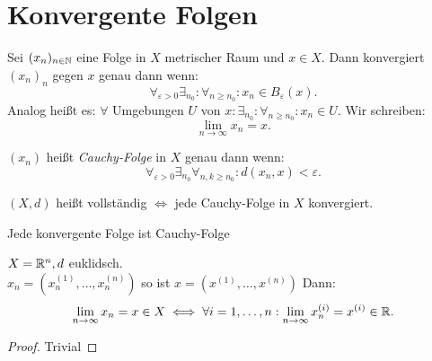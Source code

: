\section{Konvergente Folgen}
\begin{definition}
    Sei $(x_{n})_{n \in \mathbb{N}}$ eine Folge in $X$ metrischer Raum und $x \in X$. Dann konvergiert $(x_{n})_n$ gegen $x$ genau dann wenn:
    \[
        \forall_{\varepsilon > 0 } \exists_{n_0}: \forall_{n\ge n_0}: x_{n} \in B_{\varepsilon}(x)
    .\] 
    Analog heißt es: $\forall $ Umgebungen $U$ von $x: \exists_{n_0} : \forall_{n\ge n_0}: x_n \in U$. Wir schreiben:
    \[
    \lim_{n \to \infty} x_{n}=x
    .\] 
\end{definition}
\begin{definition}
    $(x_{n}) $ heißt \emph{Cauchy-Folge} in $X$ genau dann wenn:
    \[
        \forall_{\varepsilon >0} \exists_{n_0} \forall_{n,k \ge n_0} : d(x_{n},x) < \varepsilon
    .\] 
\end{definition}
\begin{definition}
$(X,d) $ heißt vollständig $\iff$ jede Cauchy-Folge in $X$ konvergiert.
\end{definition}
\begin{remark}
Jede konvergente Folge ist Cauchy-Folge
\end{remark}
\begin{example}
    $X= \mathbb{R}^n, d$ euklidsch. \\ $x_{n}= (x_{n}^{(1)}, \ldots, x_{n}^{(n)} )$ so ist $x = (x^(1),\ldots, x^{(n)})$ Dann:
    \[
    \lim_{n \to \infty} x_{n}= x \in X \iff \forall i=1,\ldots, n : \lim_{n \to \infty} x_{n}^{(i)} = x^{(i)} \in \mathbb{R}
    .\]
    \begin{proof}
    Trivial
    \end{proof}
\end{example}
